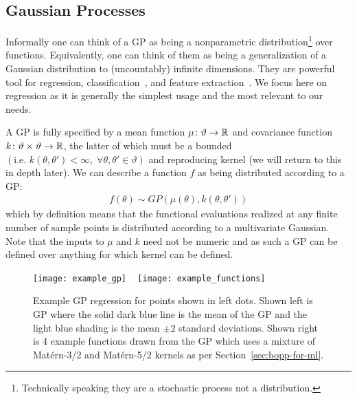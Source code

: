 
\subsection{Gaussian Processes}
\label{sec:opt:GPs}

Informally one can think of a GP \citep{rasmussen2006gaussian} as being a nonparametric 
distribution\footnote{Technically speaking they are a stochastic process not a distribution.} over functions.
Equivalently, one can think of them as being a generalization of a Gaussian distribution
to (uncountably) infinite dimensions.  They are powerful tool for regression, classification~\cite{kuss2005assessing}, 
and feature extraction~\cite{lawrence2004gaussian}.  We focus here on regression as it is generally
the simplest usage and the most relevant to our needs.

A GP is fully specified by a mean function $\mu \colon \vartheta \rightarrow \mathbb{R}$ and covariance function 
$k \colon \vartheta \times \vartheta \rightarrow \mathbb{R}$, the latter of which must be a bounded 
$\left(\text{i.e. }k\left(\theta,\theta'\right)<\infty, \; \forall \theta,\theta' \in \vartheta\right)$ 
and reproducing kernel (we will return to this in depth later).  We can describe a function $f$ as being distributed 
according to a GP:
\begin{align}
\label{eq:GP}
f \left(\theta\right) \sim GP \left(\mu\left(\theta\right), k\left(\theta,\theta'\right)\right)
\end{align}
which by definition means that the functional evaluations realized at any finite number of sample points is distributed according to a multivariate Gaussian. Note that the inputs to $\mu$ and $k$ need not be numeric and as such a GP can be defined over anything for which kernel can be defined.

\begin{figure}[t]
	\texttt{[image: example\_gp]}
		~
	\texttt{[image: example\_functions]}
	\caption{Example GP regression for points shown in left dots.  Shown left is GP where
		the solid dark blue line is the mean of the GP and the light blue shading is the
		mean $\pm2$ standard deviations.  Shown right is 4 example functions drawn
		from the GP which uses a mixture of Mat\'{e}rn-3/2 and Mat\'{e}rn-5/2 kernels
		as per Section~\ref{sec:bopp-for-ml}.\label{fig:opt:example_gp}}
\end{figure}

